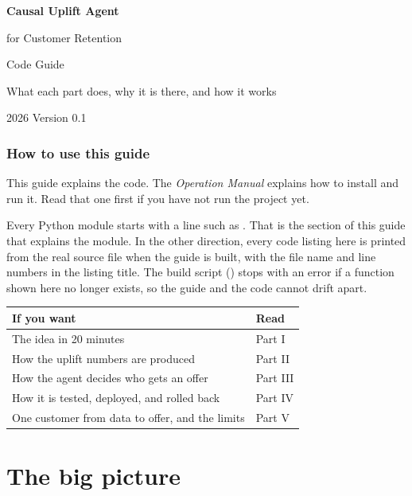 \documentclass[11pt]{article}
\begin{document}
\begin{titlepage}
\centering
\vspace*{3cm}
{\Huge\bfseries\color{accent} Causal Uplift Agent\par}
\vspace{0.4cm}
{\LARGE for Customer Retention\par}
\vspace{1.2cm}
{\Large Code Guide\par}
\vspace{0.4cm}
{\large What each part does, why it is there, and how it works\par}
\vfill
{\normalsize 2026 \quad Version 0.1\par}
\end{titlepage}

\section*{How to use this guide}
This guide explains the code. The \emph{Operation Manual} explains how to install and run it. Read that one first if you have not run the project yet.

Every Python module starts with a line such as . That is the section of this guide that explains the module. In the other direction, every code listing here is printed from the real source file when the guide is built, with the file name and line numbers in the listing title. The build script () stops with an error if a function shown here no longer exists, so the guide and the code cannot drift apart.

\begin{tabularx}{\textwidth}{@{}lL@{}}
\toprule
If you want & Read \\
\midrule
The idea in 20 minutes & Part I \\
How the uplift numbers are produced & Part II \\
How the agent decides who gets an offer & Part III \\
How it is tested, deployed, and rolled back & Part IV \\
One customer from data to offer, and the limits & Part V \\
\bottomrule
\end{tabularx}

\tableofcontents
\newpage

\part{The big picture}
\end{document}
